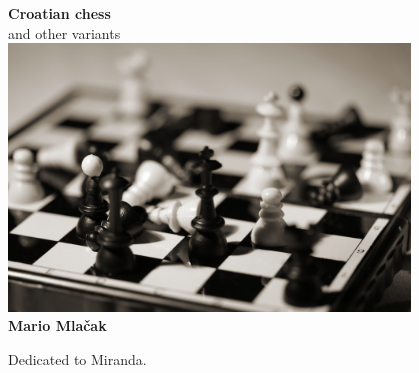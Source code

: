 \documentclass[a5paper,12pt,draft]{book} %
\begin{document}
\begin{titlepage}
\begin{center}
    \textbf{\huge{Croatian chess}} \\
    \large{and other variants} \\ [2.0cm]

    \includegraphics[width=0.8\textwidth, keepaspectratio=true]{crochess.jpg} \\ [2.0cm]

    \textbf{\large{Mario Mlačak}} \\ [2.0cm]
\end{center}
\end{titlepage}

\thispagestyle{empty}
\vspace*{0.1\textheight}
\clearpage %

\thispagestyle{empty}
\vspace*{0.2\textheight}
\hfill{Dedicated to Miranda.}
\clearpage %
\end{document}

